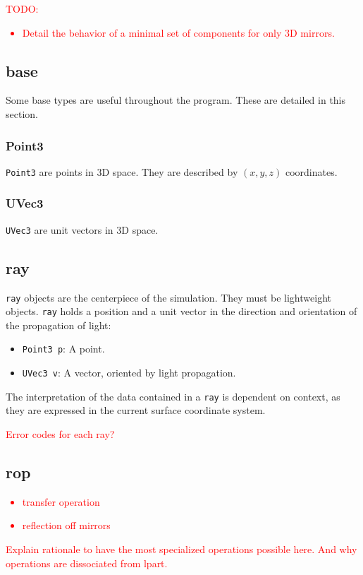 \textcolor{red}{TODO: \begin{itemize}
\item Detail the behavior of a minimal set of components for
only 3D mirrors.
\end{itemize}}

\subsection{base}
Some base types are useful throughout the program. These are detailed in this
section.

\subsubsection{Point3}
\lstinline{Point3} are points in 3D space. They are described by $(x, y, z)$
coordinates.

\subsubsection{UVec3}
\lstinline{UVec3} are unit vectors in 3D space.

\subsection{ray}
\lstinline{ray} objects are the centerpiece of the simulation. They must be
lightweight objects.  \lstinline{ray} holds a position and a unit vector in the
direction and orientation of the propagation of light:

\begin{itemize}
\item \lstinline{Point3 p}: A point.
\item \lstinline{UVec3 v}: A vector, oriented by light propagation.
\end{itemize}

The interpretation of the data contained in a \lstinline{ray} is dependent
on context, as they are expressed in the current surface coordinate system.

\textcolor{red}{Error codes for each ray?}

\subsection{rop}

\textcolor{red}{
\begin{itemize}
\item transfer operation
\item reflection off mirrors
\end{itemize}
Explain rationale to have the most specialized operations possible here.
And why operations are dissociated from lpart.}

